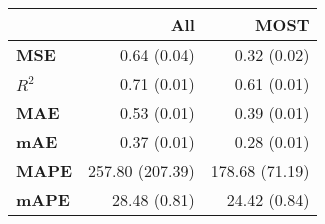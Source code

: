 \centering\begin{tabular}{l|rr}
\toprule
{} &              All &            MOST \\
\midrule
\textbf{MSE  } &  0.64 (0.04) &  0.32 (0.02) \\
\textbf{$R^2$} &  0.71 (0.01) &  0.61 (0.01) \\
\textbf{MAE  } &  0.53 (0.01) &  0.39 (0.01) \\
\textbf{mAE  } &  0.37 (0.01) &  0.28 (0.01) \\
\textbf{MAPE } &  257.80 (207.39) &  178.68 (71.19) \\
\textbf{mAPE } &  28.48 (0.81) &  24.42 (0.84) \\
\bottomrule
\end{tabular}
